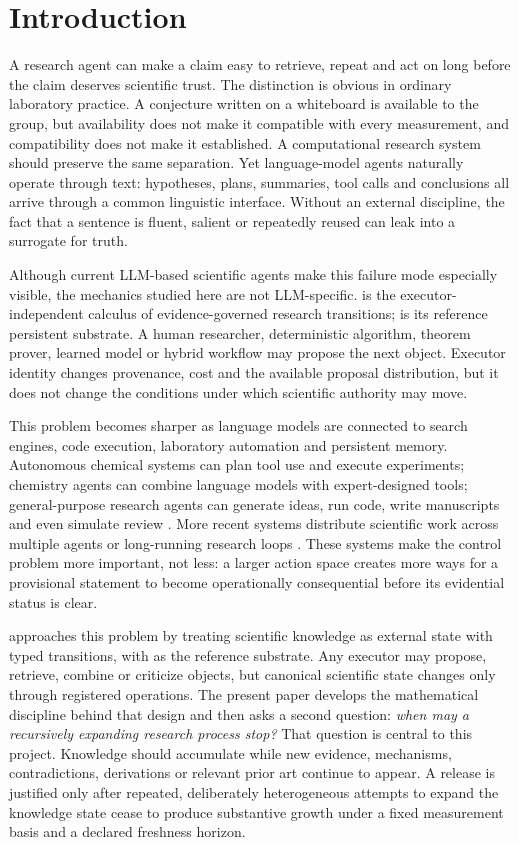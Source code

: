 \section{Introduction}

A research agent can make a claim easy to retrieve, repeat and act on long before the claim deserves scientific trust. The distinction is obvious in ordinary laboratory practice. A conjecture written on a whiteboard is available to the group, but availability does not make it compatible with every measurement, and compatibility does not make it established. A computational research system should preserve the same separation. Yet language-model agents naturally operate through text: hypotheses, plans, summaries, tool calls and conclusions all arrive through a common linguistic interface. Without an external discipline, the fact that a sentence is fluent, salient or repeatedly reused can leak into a surrogate for truth.

Although current LLM-based scientific agents make this failure mode especially visible, the mechanics studied here are not LLM-specific. \Framework{} is the executor-independent calculus of evidence-governed research transitions; \RAKL{} is its reference persistent substrate. A human researcher, deterministic algorithm, theorem prover, learned model or hybrid workflow may propose the next object. Executor identity changes provenance, cost and the available proposal distribution, but it does not change the conditions under which scientific authority may move.

This problem becomes sharper as language models are connected to search engines, code execution, laboratory automation and persistent memory. Autonomous chemical systems can plan tool use and execute experiments; chemistry agents can combine language models with expert-designed tools; general-purpose research agents can generate ideas, run code, write manuscripts and even simulate review \cite{boiko2023,bran2024,lu2024}. More recent systems distribute scientific work across multiple agents or long-running research loops \cite{gottweis2025,kosmos2025}. These systems make the control problem more important, not less: a larger action space creates more ways for a provisional statement to become operationally consequential before its evidential status is clear.

\Framework{} approaches this problem by treating scientific knowledge as external state with typed transitions, with \RAKL{} as the reference substrate. Any executor may propose, retrieve, combine or criticize objects, but canonical scientific state changes only through registered operations. The present paper develops the mathematical discipline behind that design and then asks a second question: \emph{when may a recursively expanding research process stop?} That question is central to this project. Knowledge should accumulate while new evidence, mechanisms, contradictions, derivations or relevant prior art continue to appear. A release is justified only after repeated, deliberately heterogeneous attempts to expand the knowledge state cease to produce substantive growth under a fixed measurement basis and a declared freshness horizon.

